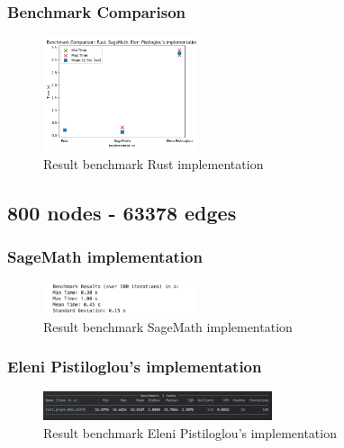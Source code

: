 \subsubsection*{Benchmark Comparison}
\begin{figure}[!h]
    \centering
    \includegraphics[width=0.40\textwidth]{images/benchmark/graph_500_24864/benchmark_comparison_graph_500_24864}
    \caption{Result benchmark Rust implementation}
    \label{fig:benchmark-comparison-graph-500-24864}
\end{figure}


\newpage


\subsection{800 nodes - 63378 edges}\label{subsec:result-for-graphs-800-63378}

\subsubsection*{SageMath implementation}
\begin{figure}[!h]
    \centering
    \includegraphics[width=0.40\textwidth]{images/benchmark/graph_800_63378/benchmark_graph_800_63378_sagemath}
    \caption{Result benchmark SageMath implementation}
    \label{fig:benchmark-graph-800-63378-sagemath}
\end{figure}

\subsubsection*{Eleni Pistiloglou's implementation}
\begin{figure}[!h]
    \centering
    \includegraphics[width=0.60\textwidth]{images/benchmark/graph_800_63378/benchmark_graph_800_63378_python}
    \caption{Result benchmark Eleni Pistiloglou's implementation}
    \label{fig:benchmark-graph-800-63378-python}
\end{figure}

